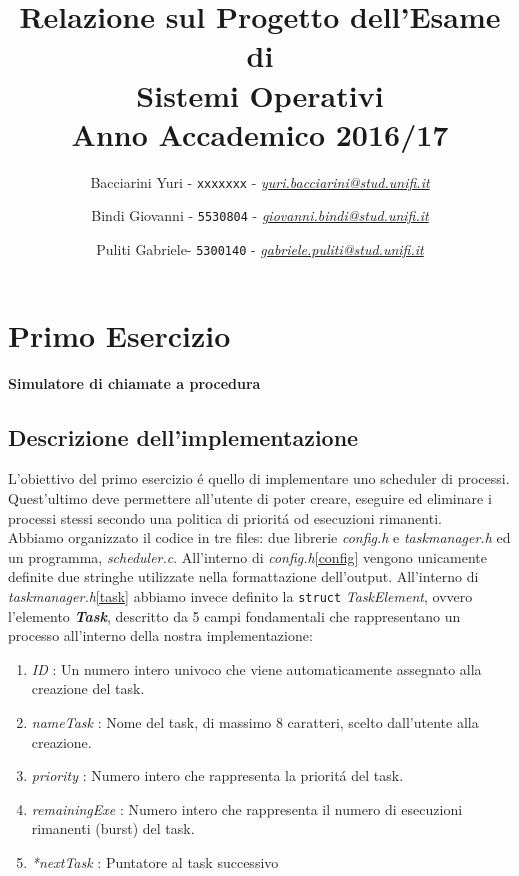 \documentclass[a4paper]{article}
\begin{document}
 

\title{\vspace{2cm}Relazione sul Progetto dell'Esame di\\ \textbf{Sistemi Operativi}\\ Anno Accademico 2016/17}

\author{Bacciarini Yuri - \texttt{xxxxxxx} - \href{mailto:yuri.bacciarini@stud.unifi.it}{\textit{yuri.bacciarini@stud.unifi.it}}
   \and Bindi Giovanni - \texttt{5530804} - \href{mailto:giovanni.bindi@stud.unifi.it}{\textit{giovanni.bindi@stud.unifi.it}}
   \and Puliti Gabriele- \texttt{5300140} - \href{mailto:gabriele.puliti@stud.unifi.it}{\textit{gabriele.puliti@stud.unifi.it}}} 



\maketitle

\tableofcontents

\newpage
\section{Primo Esercizio}
\textbf{Simulatore di chiamate a procedura}
\subsection{Descrizione dell'implementazione}
L'obiettivo del primo esercizio \'e quello di implementare uno scheduler di processi. Quest'ultimo deve permettere all'utente di poter creare, eseguire ed eliminare i processi stessi secondo una politica di priorit\'a od esecuzioni rimanenti. \\
Abbiamo organizzato il codice in tre files: due librerie \textit{config.h} e \textit{taskmanager.h} ed un programma, \textit{scheduler.c}. All'interno di \textit{config.h}\ref{config} vengono unicamente definite due stringhe utilizzate nella formattazione dell'output. All'interno di \textit{taskmanager.h}\ref{task} abbiamo invece definito la \texttt{struct} \textit{TaskElement}, ovvero l'elemento \textbf{\textit{Task}}, descritto da 5 campi fondamentali che rappresentano un processo all'interno della nostra implementazione:

\begin{enumerate}
\item \textit{ID} : Un numero intero univoco che viene automaticamente assegnato alla creazione del task.
\item \textit{nameTask} : Nome del task, di massimo 8 caratteri, scelto dall'utente alla creazione.
\item \textit{priority} : Numero intero che rappresenta la priorit\'a del task.
\item \textit{remainingExe} : Numero intero che rappresenta il numero di esecuzioni rimanenti (burst) del task.
\item \textit{*nextTask} : Puntatore al task successivo
\end{enumerate}
\end{document}
